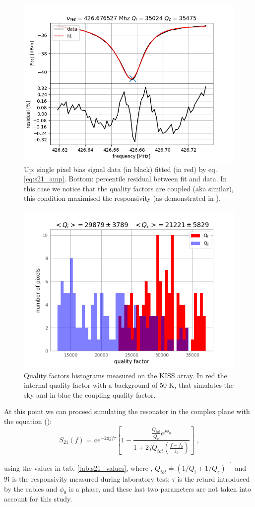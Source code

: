 \documentclass[twocolumn,traditabstract]{aa}\\
\begin{document}
\begin{figure}[htf]
	\centering
	\includegraphics[width=.5\textwidth]{3.acqui/resonance_fit.png}
	\caption{Up: single pixel bias signal data (in black) fitted (in red) by eq. \ref{eq:s21_amp}. Bottom: percentile residual between fit and data. In this case we notice that the quality factors are coupled (aka similar), this condition maximised the responsivity (as demonstrated in \cite{Gao}).}
	\label{fig:fit_amp}
\end{figure}

\begin{figure}[htf]
	\centering
	\includegraphics[width=.5\textwidth]{3.acqui/Q_hist.png}
	\caption{Quality factors histograms measured on the KISS array. In red the internal quality factor with a background of 50 K, that simulates the sky and in blue the coupling quality factor.}
	\label{fig:hist}
\end{figure}

\noindent At this point we can proceed simulating the resonator in the complex plane with the equation (\cite{Gao}):
\begin{equation}
S_{21}(f)=ae^{-2\pi j f \tau} \left[ 1-\frac{\frac{Q_{tot}}{Q_c}e^{j\phi_0}}{1+2jQ_{tot}\left(\frac{f-f_0}{f_0}\right)}\right] \text{ ,}
\label{eq:s21_IQ}
\end{equation}

\noindent using the values in tab. \ref{tab:s21_values}, where , $Q_{tot}\doteq\left( 1/Q_i + 1/Q_c \right)^{-1}$ and $\mathfrak{R}$ is the responsivity measured during laboratory test; $\tau$ is the retard introduced by the cables and $\phi_0$ is a phase, and these last two parameters are not taken into account for this study.
\end{document}
